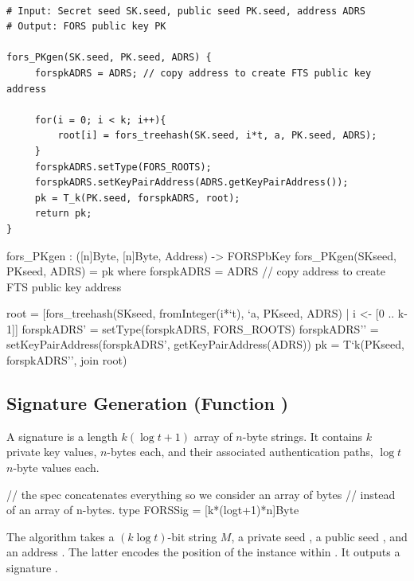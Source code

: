 \begin{lstlisting}[label=alg:fors:pkgen, language=pseudoc,
                   caption=\forspkgen\ -- Generate a FORS public key.]

# Input: Secret seed SK.seed, public seed PK.seed, address ADRS
# Output: FORS public key PK

fors_PKgen(SK.seed, PK.seed, ADRS) {
     forspkADRS = ADRS; // copy address to create FTS public key address

     for(i = 0; i < k; i++){
         root[i] = fors_treehash(SK.seed, i*t, a, PK.seed, ADRS);
     }
     forspkADRS.setType(FORS_ROOTS);
     forspkADRS.setKeyPairAddress(ADRS.getKeyPairAddress());
     pk = T_k(PK.seed, forspkADRS, root);
     return pk;
}
\end{lstlisting}

\begin{code}
  fors_PKgen : ([n]Byte, [n]Byte, Address) -> FORSPbKey
  fors_PKgen(SKseed, PKseed, ADRS) = pk where
    forspkADRS = ADRS // copy address to create FTS public key address

    root = [fors_treehash(SKseed, fromInteger(i*`t), `a, PKseed, ADRS)
            | i <- [0 .. k-1]]
    forspkADRS' = setType(forspkADRS, FORS_ROOTS)
    forspkADRS'' = setKeyPairAddress(forspkADRS', getKeyPairAddress(ADRS))
    pk = T`{k}(PKseed, forspkADRS'', join root)
\end{code}

\subsection{\fors Signature Generation (Function \forssign)}
A \fors signature is a length $k(\log t + 1)$ array of $n$-byte strings. It contains 
$k$ private key values, $n$-bytes each, and their associated authentication
paths, $\log t$ $n$-byte values each.

\begin{code}
  // the spec concatenates everything so we consider an array of bytes
  // instead of an array of n-bytes.
  type FORSSig = [k*(logt+1)*n]Byte
\end{code}

The algorithm \forssign takes a $(k\log t)$-bit string $M$, a private seed \sseed, 
a public seed \pseed, and an address \adrs. The latter encodes the position of 
the \fors instance within \spx. It outputs a \fors signature \forssig.


